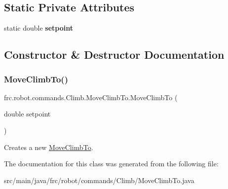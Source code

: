 \subsection*{Static Private Attributes}
\begin{DoxyCompactItemize}
\item 
\mbox{\label{classfrc_1_1robot_1_1commands_1_1_climb_1_1_move_climb_to_ab039fb06654ede41d3e9f24fa9ecd91a}} 
static double {\bfseries setpoint}
\end{DoxyCompactItemize}


\subsection{Constructor \& Destructor Documentation}
\mbox{\label{classfrc_1_1robot_1_1commands_1_1_climb_1_1_move_climb_to_a744775149caf447dd8df08b64ed7b2b3}} 
\subsubsection{\texorpdfstring{MoveClimbTo()}{MoveClimbTo()}}
{\footnotesize\ttfamily frc.\+robot.\+commands.\+Climb.\+Move\+Climb\+To.\+Move\+Climb\+To (\begin{DoxyParamCaption}\item[{double}]{setpoint }\end{DoxyParamCaption})\hspace{0.3cm}{\ttfamily [inline]}}

Creates a new \mbox{\hyperlink{classfrc_1_1robot_1_1commands_1_1_climb_1_1_move_climb_to}{Move\+Climb\+To}}. 

The documentation for this class was generated from the following file\+:\begin{DoxyCompactItemize}
\item 
src/main/java/frc/robot/commands/\+Climb/Move\+Climb\+To.\+java\end{DoxyCompactItemize}
